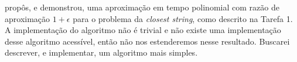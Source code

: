 \cite{li2002closest} propôs, e demonstrou, uma aproximação em tempo polinomial com razão de aproximação $1 + \epsilon$ para o problema da \textit{closest string}, como descrito na Tarefa 1.
A implementação do algoritmo não é trivial e não existe uma implementação desse algoritmo acessível, então não nos estenderemos nesse resultado. Buscarei descrever, e implementar, um algoritmo mais simples.
